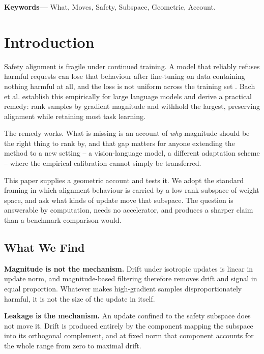 \documentclass[10pt,twocolumn,letterpaper]{article}
\begin{document}
\noindent\textbf{Keywords---} What, Moves, Safety, Subspace, Geometric, Account.







\section{Introduction}


Safety alignment is fragile under continued training. A model that reliably refuses harmful requests can lose that behaviour after fine-tuning on data containing nothing harmful at all, and the loss is not uniform across the training set \cite{arxiv_2604_17215}. Bach et al. establish this empirically for large language models and derive a practical remedy: rank samples by gradient magnitude and withhold the largest, preserving alignment while retaining most task learning.

The remedy works. What is missing is an account of \textit{why} magnitude should be the right thing to rank by, and that gap matters for anyone extending the method to a new setting -- a vision-language model, a different adaptation scheme -- where the empirical calibration cannot simply be transferred.

This paper supplies a geometric account and tests it. We adopt the standard framing in which alignment behaviour is carried by a low-rank subspace of weight space, and ask what kinds of update move that subspace. The question is answerable by computation, needs no accelerator, and produces a sharper claim than a benchmark comparison would.


\subsection{What We Find}


\textbf{Magnitude is not the mechanism.} Drift under isotropic updates is linear in update norm, and magnitude-based filtering therefore removes drift and signal in equal proportion. Whatever makes high-gradient samples disproportionately harmful, it is not the size of the update in itself.

\textbf{Leakage is the mechanism.} An update confined to the safety subspace does not move it. Drift is produced entirely by the component mapping the subspace into its orthogonal complement, and at fixed norm that component accounts for the whole range from zero to maximal drift.
\end{document}
